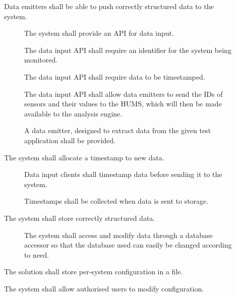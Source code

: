 \begin{description}
  	\item[]  Data emitters shall be able to push correctly structured data 	to the system.
	\begin{description}
		 \item[] The system shall provide an API for data input.

		  \item[] The data input API shall require an identifier for
 		 the system being monitored.

 		 \item[] The data input API shall require data to be
 		 timestamped.

 		 \item[] The data input API shall allow data emitters
 		 to send the IDs of sensors and their values to the HUMS, which will 		then be made available to the analysis engine.

 		 \item[] A data emitter, designed to extract data from the given 		test application shall be provided.
	\end{description}
	\item[]  The system shall allocate a timestamp to new data.
		\begin{description}
	 		 \item[]Data input clients shall timestamp data before
 			 sending it to the system.
 			 \item[] Timestamps shall be collected when data is sent 			to storage.
		 \end{description}
	 \item[] The system shall store correctly structured data.
	 	\begin{description}
	 		\item[] The system shall access and modify data 				through a database accessor so that the database used can 			easily be changed according to need.
	  \end{description}

 \item[] The solution shall store per-system configuration in
 a file.

 \item[] The system shall allow authorised users to modify
 configuration. 
\end{description}

